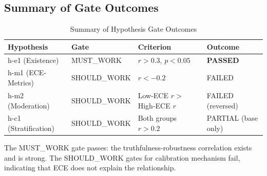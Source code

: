 \subsection{Summary of Gate Outcomes}

\begin{table}[h]
\centering
\caption{Summary of Hypothesis Gate Outcomes}
\label{tab:gates-summary}
\begin{tabular}{llll}
\toprule
\textbf{Hypothesis} & \textbf{Gate} & \textbf{Criterion} & \textbf{Outcome} \\
\midrule
h-e1 (Existence) & MUST\_WORK & $r > 0.3$, $p < 0.05$ & \textbf{PASSED} \\
h-m1 (ECE-Metrics) & SHOULD\_WORK & $r < -0.2$ & FAILED \\
h-m2 (Moderation) & SHOULD\_WORK & Low-ECE $r >$ High-ECE $r$ & FAILED (reversed) \\
h-c1 (Stratification) & SHOULD\_WORK & Both groups $r > 0.2$ & PARTIAL (base only) \\
\bottomrule
\end{tabular}
\end{table}

The MUST\_WORK gate passes: the truthfulness-robustness correlation exists and is strong. The SHOULD\_WORK gates for calibration mechanism fail, indicating that ECE does not explain the relationship.
